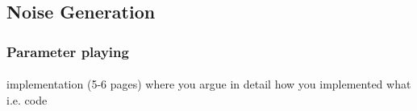 \newpage
\subsection{Noise Generation}\paragraph{}
\subsubsection{Parameter playing}\paragraph{}

implementation (5-6 pages) where you argue in detail how you implemented what i.e. code